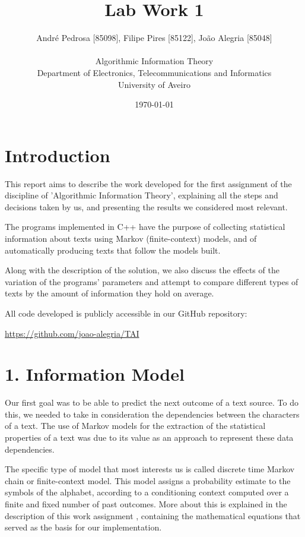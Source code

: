 \documentclass[12pt]{article}
\title{Lab Work 1}
\author
{André Pedrosa [85098], Filipe Pires [85122], João Alegria [85048]\\
\\
Algorithmic Information Theory\\
\normalsize{Department of Electronics, Telecommunications and Informatics}\\
\normalsize{University of Aveiro}\\
}
\date{\today{}}
\begin{document}
 

\baselineskip18pt

\maketitle 

\section*{Introduction}

This report aims to describe the work developed for the first assignment
of the discipline of 'Algorithmic Information Theory', explaining all the 
steps and decisions taken by us, and presenting the results we considered 
most relevant. 

The programs implemented in C++ have the purpose of collecting statistical
information about texts using Markov (finite-context) models, and of 
automatically producing texts that follow the models built.

Along with the description of the solution, we also discuss the effects
of the variation of the programs' parameters and attempt to compare 
different types of texts by the amount of information they hold on average.

All code developed is publicly accessible in our GitHub repository:

\url{https://github.com/joao-alegria/TAI}
\newpage

\section*{1. Information Model}

Our first goal was to be able to predict the next outcome of a text source.
To do this, we needed to take in consideration the dependencies between 
the characters of a text.
The use of Markov models for the extraction of the statistical properties of a
text was due to its value as an approach to represent these data dependencies.

The specific type of model that most interests us is called discrete time
Markov chain or finite-context model.
This model assigns a probability estimate to the symbols of the alphabet, 
according to a conditioning context computed over a finite and fixed number
of past outcomes. 
More about this is explained in the description of this work assignment 
\cite{trab1}, containing the mathematical equations that served as the basis 
for our implementation.
\end{document}
